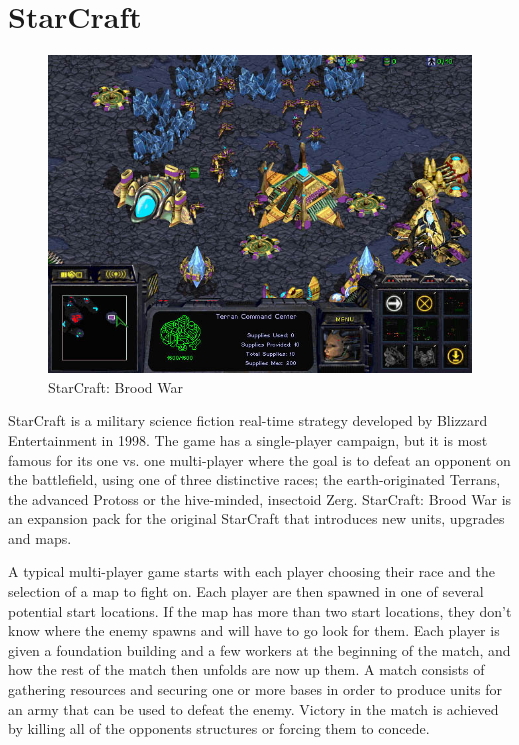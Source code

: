 
\section{StarCraft}
\label{sec:starcrafttheory}
\begin{figure}[h!tb]
\centering
\includegraphics[scale=0.5]{graphics/scbw.jpg}
\caption{StarCraft: Brood War}
\label{fig:scbwIntro}
\end{figure}

StarCraft is a military science fiction real-time strategy developed by Blizzard
Entertainment in 1998.\cite{starcraft} The game has a single-player campaign,
but it is most famous for its one vs. one multi-player where the goal is to
defeat an opponent on the battlefield, using one of three distinctive races;
the earth-originated Terrans, the advanced Protoss or the hive-minded,
insectoid Zerg. StarCraft: Brood War is an expansion pack for the original
StarCraft that introduces new units, upgrades and maps. 

A typical multi-player game starts with each player choosing their race and the
selection of a map to fight on. Each player are then spawned in one of
several potential start locations. If the map has more than two start
locations, they don't know where the enemy spawns and will have to go look for
them. Each player is given a foundation building and a few workers at the
beginning of the match, and how the rest of the match then unfolds are now up
them. A match consists of gathering resources and securing one or more bases in
order to produce units for an army that can be used to defeat the enemy. Victory
in the match is achieved by killing all of the opponents structures or forcing
them to concede.

